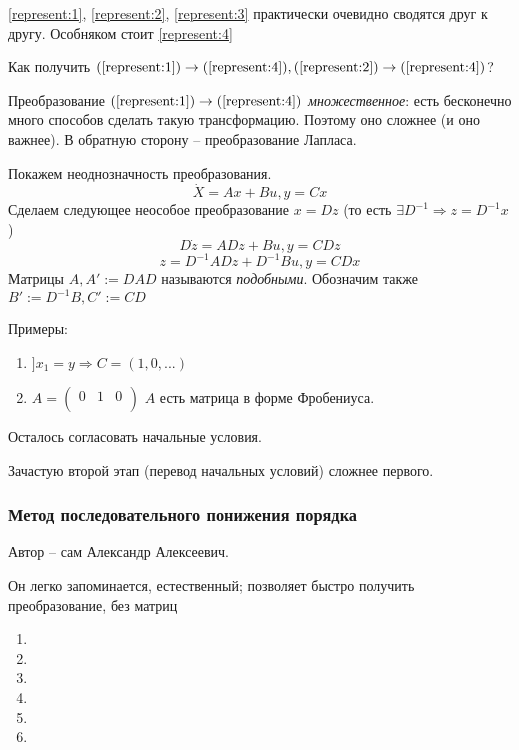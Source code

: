 \documentclass[main.tex]{subfiles}
\begin{document}
\ref{represent:1}, \ref{represent:2}, \ref{represent:3} практически очевидно сводятся друг к другу.
Особняком стоит \ref{represent:4}


Как получить $ (\ref{represent:1}) \to (\ref{represent:4}), (\ref{represent:2}) \to (\ref{represent:4}) $?

Преобразование $ (\ref{represent:1}) \to (\ref{represent:4}) $ \emph{множественное}: есть бесконечно много способов сделать такую трансформацию.
Поэтому оно сложнее (и оно важнее).
В обратную сторону -- преобразование Лапласа.

Покажем неоднозначность преобразования.
$$ \dot X = Ax + Bu, y = Cx $$
Сделаем следующее неособое преобразование $ x = Dz $ (то есть $ \exists D^{-1} \Rightarrow z = D^{-1}x $)
$$ D \dot z = ADz + Bu, y = CDz $$
$$ z = D^{-1}ADz + D^{-1}Bu, y = CDx $$
Матрицы $ A, A':=DAD $ называются \emph{подобными}. Обозначим также $B':=D^{-1}B, C':=CD$

Примеры:
\begin{enumerate}[noitemsep]
	\item $ ] x_1 = y \Rightarrow C = (1, 0, ...) $
	\item $ A = \begin{pmatrix}
	 0 & 1 & 0 \\ %
	\end{pmatrix} $
	$ A $ есть матрица в форме Фробениуса.
\end{enumerate}

Осталось согласовать начальные условия.

Зачастую второй этап (перевод начальных условий) сложнее первого.

\subsubsection{ Метод последовательного понижения порядка }
Автор -- сам Александр Алексеевич.

Он легко запоминается, естественный; позволяет быстро получить преобразование, без матриц

\begin{enumerate}[noitemsep]
	\item
	\item
	\item
	\item
	\item
	\item
\end{enumerate}
\end{document}
